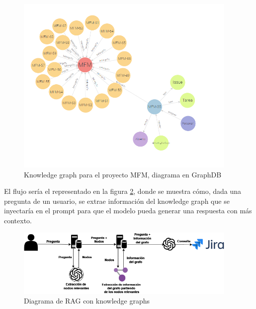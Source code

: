 \begin{figure}[H]
    \centering
    \includegraphics[width=0.95\textwidth]{images/desglose_kg.png}
    \caption{Knowledge graph para el proyecto MFM, diagrama en GraphDB}\label{fig:desglose_kg}
\end{figure}

El flujo sería el representado en la figura \ref{fig:kg}, donde se muestra cómo, dada una pregunta de un usuario, se extrae información del knowledge graph que se inyectaría en el prompt para que el modelo pueda generar una respuesta con más contexto.

\begin{figure}[H]
    \centering
    \includegraphics[width=0.95\textwidth]{images/rag_grafo.png}
    \caption{Diagrama de RAG con knowledge graphs}\label{fig:kg}
\end{figure}
